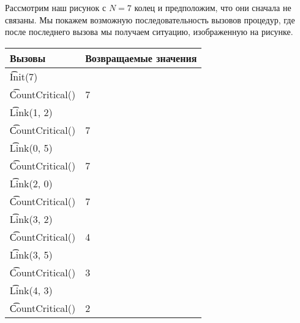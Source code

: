 Рассмотрим наш рисунок с $N = 7$ колец и предположим, что они сначала не связаны. Мы покажем возможную последовательность вызовов процедур, где после последнего вызова мы получаем ситуацию, изображенную на рисунке.

\begin{tabular}{|l|l|}
\hline
\bf{Вызовы}&\bf{Возвращаемые значения}\\\hline
\t{Init(7)}&\\\hline
\t{CountCritical()}&7\\\hline
\t{Link(1, 2)}&\\\hline
\t{CountCritical()}&7\\\hline
\t{Link(0, 5)}&\\\hline
\t{CountCritical()}&7\\\hline
\t{Link(2, 0)}&\\\hline
\t{CountCritical()}&7\\\hline
\t{Link(3, 2)}&\\\hline
\t{CountCritical()}&4\\\hline
\t{Link(3, 5)}&\\\hline
\t{CountCritical()}&3\\\hline
\t{Link(4, 3)}&\\\hline
\t{CountCritical()}&2\\\hline
\end{tabular}